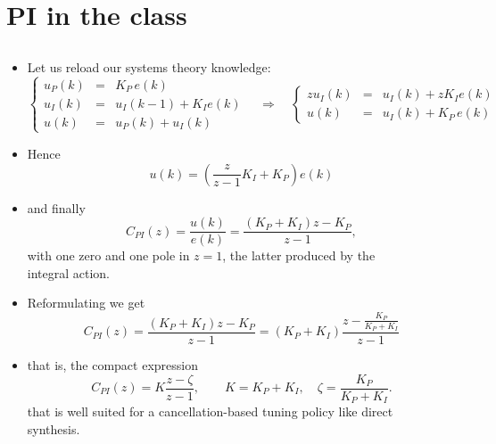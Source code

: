 \section{PI in the class}
\subsection{}

\begin{frame}
\framesubtitleTC{}
\myPause
 \begin{itemize}[<+-| alert@+>]
 \item Let us reload our systems theory knowledge:
       \begin{displaymath}
        \left\{\begin{array}{rcl}
         u_P(k) &=& K_P \, e(k) \\
         u_I(k) &=& u_I(k-1)+ K_I e(k) \\
         u(k)   &=& u_P(k)+u_I(k)
        \end{array}\right. \quad
        {\Rightarrow} \quad
        \left\{\begin{array}{rcl}
         zu_I(k) &=& u_I(k) + zK_I e(k) \\
         u(k)    &=& u_I(k) + K_P \, e(k)
        \end{array}\right.
       \end{displaymath}
 \item Hence
       \begin{displaymath}
        u(k) = \left( \frac{z}{z-1}K_I + K_P \right) e(k)
       \end{displaymath}
 \item and finally
       \begin{displaymath}
        C_{PI}(z) = \frac{u(k)}{e(k)} = \frac{(K_P+K_I)z-K_P}{z-1},
       \end{displaymath}
       with one zero and one pole in $z=1$, the latter produced by the\\
       integral action.
 \end{itemize}
\end{frame}

\begin{frame}
\framesubtitleTC{}
\myPause
 \begin{itemize}[<+-| alert@+>]
 \item Reformulating we get
       \begin{displaymath}
        C_{PI}(z) = \frac{(K_P+K_I)z-K_P}{z-1}
                  = \left( K_P+K_I \right) \frac{z-\frac{K_P}{K_P+K_I}}{z-1}
       \end{displaymath}
 \item that is, the compact expression
       \begin{displaymath}
        C_{PI}(z) = K \frac{z-\zeta}{z-1}, \qquad
        K         = K_P+K_I, \quad
        \zeta     = \frac{K_P}{K_P+K_I}.
       \end{displaymath}
       that is well suited for a cancellation-based tuning policy like direct\\
       synthesis.
 \end{itemize}
\end{frame}

